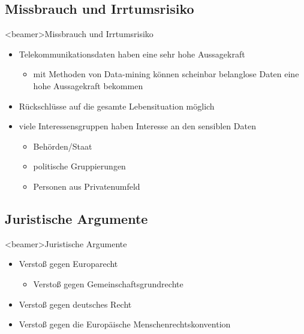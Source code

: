   \subsection{Missbrauch und Irrtumsrisiko}
    \begin{frame}<beamer>{Missbrauch und Irrtumsrisiko}
      \begin{itemize}
        \item
          Telekommunikationsdaten haben eine sehr hohe Aussagekraft
      \begin{itemize}
         \item mit Methoden von Data-mining können scheinbar belanglose Daten eine hohe Aussagekraft bekommen
      \end{itemize}
        \item
          Rückschlüsse auf die gesamte Lebensituation möglich
 \item viele Interessensgruppen haben Interesse an den sensiblen Daten
          \begin{itemize}
         \item Behörden/Staat
         \item politische Gruppierungen
         \item Personen aus Privatenumfeld
      \end{itemize}
 
      \end{itemize}
    \end{frame}

  \subsection{Juristische Argumente}
    \begin{frame}<beamer>{Juristische Argumente}
      \begin{itemize}
        \item Verstoß gegen Europarecht
           \begin{itemize}
         \item Verstoß gegen Gemeinschaftsgrundrechte
      \end{itemize}
        \item Verstoß gegen deutsches Recht
        \item Verstoß gegen die Europäische Menschenrechtskonvention
      \end{itemize}
    \end{frame}
    
